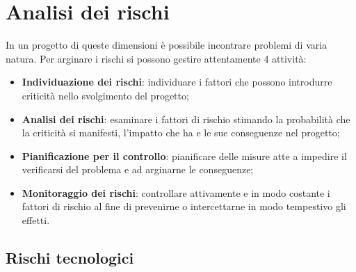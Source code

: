 \section{Analisi dei rischi}

In un progetto di queste dimensioni è possibile incontrare problemi di varia natura. Per arginare i rischi si possono gestire attentamente 4 attività:

\begin{itemize}
	\item \textbf{Individuazione dei rischi}: individuare i fattori che possono introdurre criticità nello svolgimento del progetto;
	\item \textbf{Analisi dei rischi}: esaminare i fattori di rischio stimando la probabilità che la criticità si manifesti, l'impatto che ha e le sue conseguenze nel progetto;
	\item \textbf{Pianificazione per il controllo}: pianificare delle misure atte a impedire il verificarsi del problema e ad arginarne le conseguenze;
	\item \textbf{Monitoraggio dei rischi}: controllare attivamente e in modo costante i fattori di rischio al fine di prevenirne o intercettarne in modo tempestivo gli effetti.
\end{itemize}


\subsection{Rischi tecnologici}




